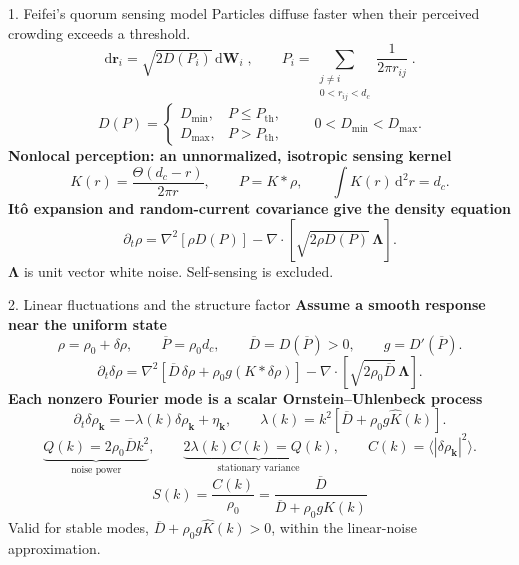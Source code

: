 \documentclass[aspectratio=169,10pt]{beamer}
\newcommand{\Db}{\overline D}
\newcommand{\Pb}{\overline P}
\newcommand{\rh}{\rho_0}
\begin{document}
\begin{frame}{1. Feifei's quorum sensing model}
Particles diffuse faster when their perceived crowding exceeds a threshold.
\[
 \mathrm d\mathbf r_i=\sqrt{2D(P_i)}\,\mathrm d\mathbf W_i\;,
 \qquad P_i=\sum_{\substack{j\ne i\\0<r_{ij}<d_c}}\frac{1}{2\pi r_{ij}}\;.
\]
\[
D(P)=\begin{cases}D_{\min},&P\le P_{\mathrm{th}},\\D_{\max},&P>P_{\mathrm{th}},\end{cases}
\qquad 0<D_{\min}<D_{\max}.
\]
\textbf{Nonlocal perception: an unnormalized, isotropic sensing kernel}
\[
K(r)=\frac{\Theta(d_c-r)}{2\pi r},\qquad P=K*\rho,
\qquad\int K(r)\,\mathrm d^2r=d_c.
\]
\textbf{Itô expansion and random-current covariance give the density equation}
\[
\partial_t\rho=\nabla^2[\rho D(P)]
 -\nabla\!\cdot\!\left[\sqrt{2\rho D(P)}\,\boldsymbol\Lambda\right].
\]
\small $\boldsymbol\Lambda$ is unit vector white noise. Self-sensing is excluded.
\end{frame}

\begin{frame}{2. Linear fluctuations and the structure factor}
\textbf{Assume a smooth response near the uniform state}
\[
\rho=\rh+\delta\rho,\qquad \Pb=\rh d_c,\qquad
\Db=D(\Pb)>0,\qquad g=D'(\Pb).
\]
\[
\partial_t\delta\rho=
\nabla^2\!\left[\Db\,\delta\rho+\rh g(K*\delta\rho)\right]
-\nabla\!\cdot\!\left[\sqrt{2\rh\Db}\,\boldsymbol\Lambda\right].
\]
\textbf{Each nonzero Fourier mode is a scalar Ornstein--Uhlenbeck process}
\[
\partial_t\delta\rho_{\mathbf k}=-\lambda(k)\delta\rho_{\mathbf k}+\eta_{\mathbf k},
\qquad\lambda(k)=k^2\left[\Db+\rh g\widehat K(k)\right].
\]
\[
\underbrace{Q(k)=2\rh\Db k^2}_{\text{noise power}},\qquad
\underbrace{2\lambda(k)C(k)=Q(k)}_{\text{stationary variance}},\qquad
C(k)=\langle|\delta\rho_{\mathbf k}|^2\rangle.
\]
\[
\mathord{\displaystyle S(k)=\frac{C(k)}{\rh}
=\frac{\Db}{\Db+\rh g\widehat K(k)}}
\]
\small Valid for stable modes, $\Db+\rh g\widehat K(k)>0$, within the linear-noise approximation.
\end{frame}
\end{document}
